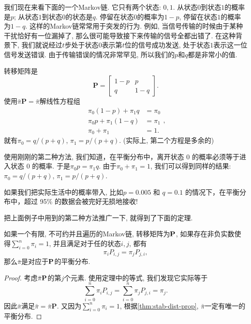 \begin{example}
    我们现在来看下面的一个Markov链. 它只有两个状态: $0, 1$. 从状态$0$到状态$1$的概率是$p$; 从状态$1$到状态$0$的状态是$q$. 停留在状态$0$的概率为$1-p$, 停留在状态$1$的概率为$1-q$. 这样的Markov链常常用于突发的行为. 例如, 当信号传输的时候由于某种干扰恰好有一位漏掉了, 那么很可能导致接下来传输的信号全都出错了. 在这种背景下, 我们就说经过$t$步处于状态$0$表示第$t$位的信号成功发送, 处于状态$1$表示这一位信号发送错误. 由于传输错误的情况非常罕见, 所以我们的$p$和$q$都是非常小的值.

    转移矩阵是
    $$\mathbf{P}=\left[\begin{array}{cc}1-p & p \\ q & 1-q\end{array}\right].$$
    使用$\bar{\pi} \mathbf{P}=\bar{\pi}$解线性方程组
    $$\begin{aligned} \pi_0(1-p)+\pi_1 q & =\pi_0 \\ \pi_0 p+\pi_1(1-q) & =\pi_1 \\ \pi_0+\pi_1 & =1 .\end{aligned},$$
    就有$\pi_0=q /(p+q)$, $\pi_1=p/(p+q)$. (实际上, 第二个方程是多余的)

    使用刚刚的第二种方法, 我们知道，在平衡分布中，离开状态 $0$ 的概率必须等于进入状态 $0$ 的概率. 于是$\pi_0 p=\pi_1 q$. 由于$\pi_0+\pi_1=1$, 我们可以得到同样的结果:$\pi_0=q /(p+q)$, $\pi_1=p/(p+q)$. 

    如果我们把实际生活中的概率带入, 比如$p = 0.005$ 和 $q = 0.1$ 的情况下，在平衡分布中，超过 95\% 的数据会被完好无损地接收!

\end{example}

把上面例子中用到的第二种方法推广一下, 就得到了下面的定理. 

\begin{theorem}
    如果一个有限, 不可约并且遍历的Markov链, 转移矩阵为$\bf P$, 如果存在非负实数使得$\sum_{i=0}^n \pi_i=1$, 并且满足对于任的状态$i,j$, 都有$$\pi_i P_{i, j}=\pi_j P_{j, i},$$
    那么$\bar\pi$是对应于$\bf P$的平衡分布. 
\end{theorem}

\begin{proof}
    考虑$\bar{\pi} \bf{P}$的第$j$个元素. 使用定理中的等式, 我们发现它实际等于$$\sum_{i=0}^n \pi_i P_{i, j}=\sum_{i=0}^n \pi_j P_{j, i}=\pi_j.$$ 因此$\bar \pi$满足$\bar{\pi}=\bar{\pi} \mathbf{P}$. 又因为$\sum_{i=0}^n \pi_i=1$, 根据\cref{thm:stab-dist-prop}, $\bar\pi$一定有唯一的平衡分布. 
\end{proof}

